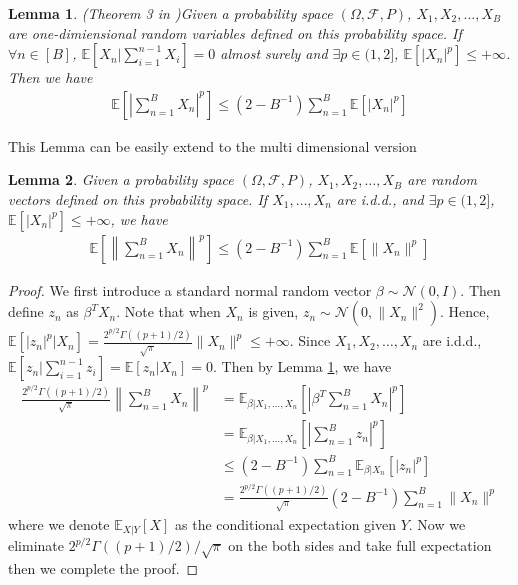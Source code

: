 \documentclass{article}
\newtheorem{lemma}{Lemma}
\def \E {\mathbb{E}}
\begin{document}
\begin{lemma}{(Theorem 3 in \citep{von_1965inequalities})}\label{app_lem:scalar_batch_size_noise}
Given a probability space $(\Omega,\mathcal{F},P)$, $X_1,X_2,\dots,X_B$ are one-dimiensional random variables defined on this probability space. If $\forall n\in[B]$, $\E[X_n|\sum_{i=1}^{n-1} X_i]=0$ almost surely and $\exists p\in(1,2]$, $\E[|X_n|^p]\leq +\infty$. Then we have
\begin{align}
    \E\left[\left|\sum_{n=1}^B X_n\right|^p\right]\leq (2-B^{-1})\sum_{n=1}^B \E[\left|X_n\right|^p]
\end{align}
    
\end{lemma}
This Lemma can be easily extend to the multi dimensional version
\begin{lemma}\label{app_lem:vector_batch_size_noise}
    Given a probability space $(\Omega,\mathcal{F},P)$, $X_1,X_2,\dots,X_B$ are random vectors defined on this probability space. If $X_1,\dots,X_n$ are i.d.d., and $\exists p\in(1,2]$, $\E[|X_n|^p]\leq +\infty$, we have
    \begin{align}
        \E\left[\left\|\sum_{n=1}^B X_n\right\|^p\right] \leq (2-B^{-1})\sum_{n=1}^B\E[\|X_n\|^p]
    \end{align}
\end{lemma}


\begin{proof}
    We first introduce a standard normal random vector $\beta\sim\mathcal{N}(0,I)$. Then define $z_n$ as $\beta^T X_n$. Note that when $X_n$ is given, $z_n\sim\mathcal{N}(0,\|X_n\|^2)$. Hence, $\E[|z_n|^p|X_n]=\frac{2^{p/2}\Gamma((p+1)/2)}{\sqrt{\pi}}\|X_n\|^p\leq+\infty$. Since $X_1,X_2,\dots,X_n$ are i.d.d., $\E[z_n|\sum_{i=1}^{n-1}z_i]=\E[z_n|X_n]=0$. Then by Lemma \ref{app_lem:scalar_batch_size_noise}, we have
    \begin{align}
        \frac{2^{p/2}\Gamma((p+1)/2)}{\sqrt{\pi}}\left\|\sum_{n=1}^B X_n\right\|^p &= \E_{\beta|X_1,\dots,X_n}\left[\left|\beta^T\sum_{n=1}^B X_n\right|^p\right]\nonumber\\
        & = \E_{\beta|X_1,\dots,X_n}\left[\left|\sum_{n=1}^B z_n\right|^p\right]\nonumber\\
        &\leq (2-B^{-1})\sum_{n=1}^B\E_{\beta|X_n}\left[|z_n|^p\right] \nonumber\\
        &=\frac{2^{p/2}\Gamma((p+1)/2)}{\sqrt{\pi}}(2-B^{-1})\sum_{n=1}^B\|X_n\|^p
    \end{align}
    where we denote $\E_{X|Y}[X]$ as the conditional expectation given $Y$. Now we eliminate $2^{p/2}\Gamma((p+1)/2)/\sqrt{\pi}$ on the both sides and take full expectation then we complete the proof. 
\end{proof}
\end{document}
